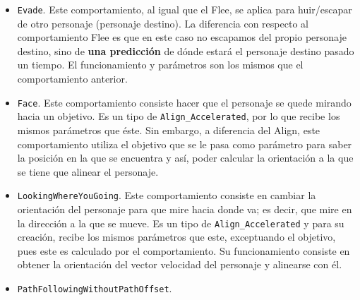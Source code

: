 \begin{itemize}
 \item \texttt{Evade}. Este comportamiento, al igual que el Flee, se aplica para huir/escapar de otro personaje (personaje destino). La diferencia con respecto al comportamiento Flee es que en este caso no escapamos del propio personaje destino, sino de \textbf{una predicción} de dónde estará el personaje destino pasado un tiempo. El funcionamiento y parámetros son los mismos que el comportamiento anterior.
 
 \item \texttt{Face}. Este comportamiento consiste hacer que el personaje se quede mirando hacia un objetivo. Es un tipo de \texttt{Align\_Accelerated}, por lo que recibe los mismos parámetros que éste. Sin embargo, a diferencia del Align, este comportamiento utiliza el objetivo que se le pasa como parámetro para saber la posición en la que se encuentra y así, poder calcular la orientación a la que se tiene que alinear el personaje.
 
 
 \item \texttt{LookingWhereYouGoing}. Este comportamiento consiste en cambiar la orientación del personaje para que mire hacia donde va; es decir, que mire en la dirección a la que se mueve. Es un tipo de \texttt{Align\_Accelerated} y para su creación, recibe los mismos parámetros que este, exceptuando el objetivo, pues este es calculado por el comportamiento. Su funcionamiento consiste en obtener la orientación del vector velocidad del personaje y alinearse con él.
 
 \item \texttt{PathFollowingWithoutPathOffset}. 
 

\end{itemize}
